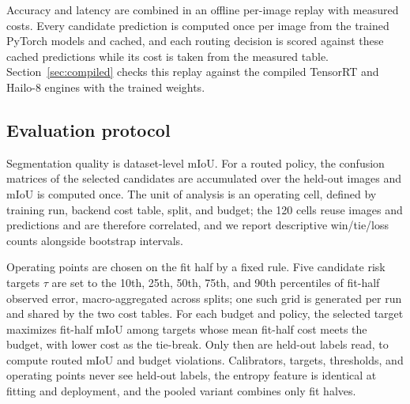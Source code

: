 \documentclass[a4paper,5p]{elsarticle}
\newcommand{\miou}{mIoU}
\begin{document}
Accuracy and latency are combined in an offline per-image replay with measured costs. Every candidate prediction is computed once per image from the trained PyTorch models and cached, and each routing decision is scored against these cached predictions while its cost is taken from the measured table. Section~\ref{sec:compiled} checks this replay against the compiled TensorRT and Hailo-8 engines with the trained weights.

\subsection{Evaluation protocol}
\label{sec:split}

Segmentation quality is dataset-level \miou{}. For a routed policy, the confusion matrices of the selected candidates are accumulated over the held-out images and \miou{} is computed once. The unit of analysis is an operating cell, defined by training run, backend cost table, split, and budget; the 120 cells reuse images and predictions and are therefore correlated, and we report descriptive win/tie/loss counts alongside bootstrap intervals.

Operating points are chosen on the fit half by a fixed rule. Five candidate risk targets $\tau$ are set to the 10th, 25th, 50th, 75th, and 90th percentiles of fit-half observed error, macro-aggregated across splits; one such grid is generated per run and shared by the two cost tables. For each budget and policy, the selected target maximizes fit-half \miou{} among targets whose mean fit-half cost meets the budget, with lower cost as the tie-break. Only then are held-out labels read, to compute routed \miou{} and budget violations. Calibrators, targets, thresholds, and operating points never see held-out labels, the entropy feature is identical at fitting and deployment, and the pooled variant combines only fit halves.
\end{document}
